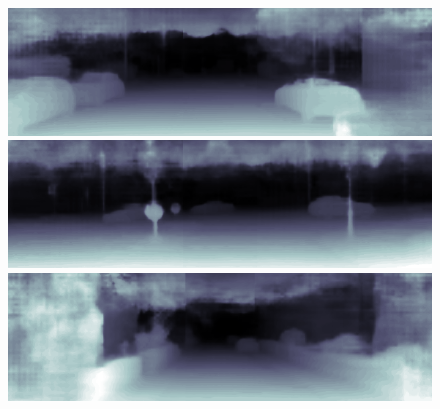 \documentclass{svjour3}                     %
\begin{document}
\begin{figure}[t]
{\begin{minipage}[b]{0.15\linewidth}
  \includegraphics[width=1\linewidth]{images/dorn/2011_09_26_drive_0009_sync_0000000340.png}\vspace{4pt}
  \includegraphics[width=1\linewidth]{images/dorn/2011_09_26_drive_0009_sync_0000000388.png}\vspace{4pt}
  \includegraphics[width=1\linewidth]{images/dorn/2011_09_30_drive_0018_sync_0000000642.png}
  \end{minipage}}
\end{figure}
\end{document}
